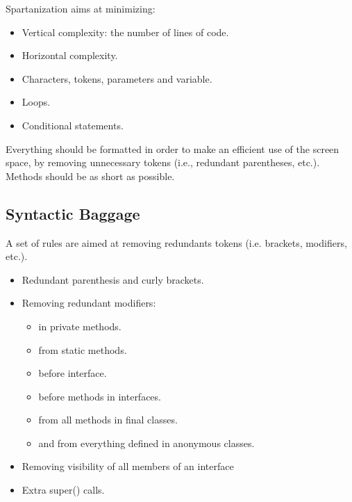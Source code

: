 Spartanization aims at minimizing:
\begin{itemize}
 \item Vertical complexity: the number of lines of code.
 \item Horizontal complexity.
 \item Characters, tokens, parameters and variable.
 \item Loops.
 \item Conditional statements.
\end{itemize}

Everything should be formatted in order to make an efficient use of the screen space,
by removing unnecessary tokens (i.e., redundant parentheses, etc.).
Methods should be as short as possible.

\subsection{Syntactic Baggage}
A set of rules are aimed at removing redundants tokens (i.e. brackets, modifiers, etc.).
\begin{itemize}
  \item Redundant parenthesis and curly brackets.
  \item Removing redundant modifiers:
  \begin{itemize}
    \item {} in private methods.
    \item {} from static methods.
    \item {} before interface.
    \item {} before methods in interfaces.
    \item {} from all methods in final classes.
    \item {} and  from everything defined in anonymous classes.
  \end{itemize}
  \item Removing visibility of all members of an interface
  \item Extra super() calls.
\end{itemize}

